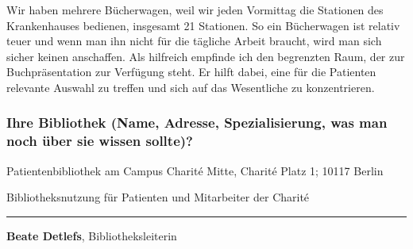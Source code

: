 Wir haben mehrere Bücherwagen, weil wir jeden Vormittag die Stationen
des Krankenhauses bedienen, insgesamt 21 Stationen. So ein Bücherwagen
ist relativ teuer und wenn man ihn nicht für die tägliche Arbeit
braucht, wird man sich sicher keinen anschaffen. Als hilfreich empfinde
ich den begrenzten Raum, der zur Buchpräsentation zur Verfügung steht.
Er hilft dabei, eine für die Patienten relevante Auswahl zu treffen und
sich auf das Wesentliche zu konzentrieren.

\hypertarget{ihre-bibliothek-name-adresse-spezialisierung-was-man-noch-uxfcber-sie-wissen-sollte}{%
\subsubsection*{Ihre Bibliothek (Name, Adresse, Spezialisierung, was man noch
über sie wissen
sollte)?}\label{ihre-bibliothek-name-adresse-spezialisierung-was-man-noch-uxfcber-sie-wissen-sollte}}

Patientenbibliothek am Campus Charité Mitte, Charité Platz 1; 10117
Berlin

Bibliotheksnutzung für Patienten und Mitarbeiter der Charité

\begin{center}\rule{0.5\linewidth}{\linethickness}\end{center}

\textbf{Beate Detlefs}, Bibliotheksleiterin